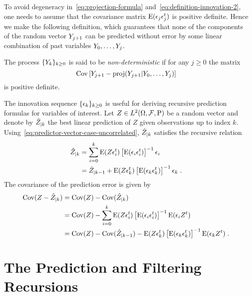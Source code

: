 To avoid degeneracy in~\eqref{eq:projection-formula}
and~\eqref{eq:definition-innovation-2}, one needs to assume that the covariance
matrix $\operatorname{E}(\epsilon_j \epsilon_j^t)$ is positive definite. Hence we make the following
definition, which guarantees that none of the components of the random vector
$Y_{j+1}$ can be predicted without error by some linear combination of past
variables $Y_0, \ldots, Y_{j}$.

\begin{defi}
  \label{defi:nondetproc} 
  The process $\{Y_k\}_{k\geq 0}$ is said to be \emph{non-deterministic} if for any $j \geq 0$ the matrix
  \[
    \operatorname{Cov}\left[Y_{j+1} - \operatorname{proj}({Y_{j+1}}|Y_0, \ldots, Y_j)\right]
  \]
  is positive definite.
\end{defi}

The innovation sequence $\{ \epsilon_k \}_{k \geq 0}$ is useful for deriving
recursive prediction formulas for variables of interest. Let $Z \in
L^2(\Omega,\mathcal{F},\operatorname{P})$ be a random vector and denote by
$\hat{Z}_{|k}$ the best linear prediction of $Z$ given observations up to
index $k$.  Using~\eqref{eq:predictor-vector-case-uncorrelated},
$\hat{Z}_{|k}$ satisfies the recursive relation
\begin{align}
\label{eq:prediction-general}
\hat{Z}_{|k} &= \sum_{i=0}^k \operatorname{E}(Z \epsilon_i^t) \left[ \operatorname{E}(\epsilon_i \epsilon_i^t) \right]^{-1} \epsilon_i  \\
               &= \hat{Z}_{|k-1} + \operatorname{E}(Z \epsilon_k^t) \left[ \operatorname{E}(\epsilon_k \epsilon_k^t) \right]^{-1} \epsilon_k \; . \nonumber
\end{align}
The covariance of the prediction error is given by
\begin{align}
\label{eq:prediction-error-covariance}
\operatorname{Cov}(Z - \hat{Z}_{|k})&= \operatorname{Cov}(Z) - \operatorname{Cov}(\hat{Z}_{|k}) \\
                         &= \operatorname{Cov}(Z) - \sum_{i=0}^k \operatorname{E}(Z \epsilon_i^t) \left[ \operatorname{E}(\epsilon_i \epsilon_i^t) \right]^{-1} \operatorname{E}(\epsilon_i Z^t) \nonumber \\
                         &= \operatorname{Cov}(Z) - \operatorname{Cov}(\hat{Z}_{|k-1}) - \operatorname{E}(Z \epsilon_k^t) \left[ \operatorname{E}(\epsilon_k \epsilon_k^t) \right]^{-1} \operatorname{E}(\epsilon_k Z^t) \; . \nonumber
\end{align}

\section{The Prediction and Filtering Recursions}
\label{sec:kalman:filtering:again}

